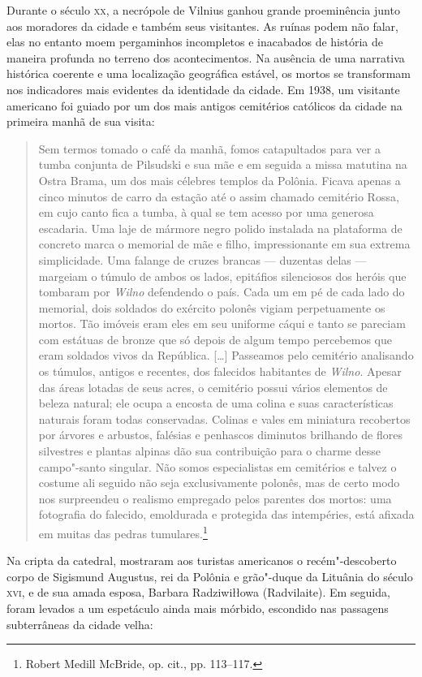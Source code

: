 Durante o século \textsc{xx}, a necrópole de Vilnius ganhou grande proeminência
junto aos moradores da cidade e também seus visitantes. As ruínas podem
não falar, elas no entanto moem pergaminhos incompletos e inacabados de
história de maneira profunda no terreno dos acontecimentos. Na ausência
de uma narrativa histórica coerente e uma localização geográfica
estável, os mortos se transformam nos indicadores mais evidentes da
identidade da cidade. Em 1938, um visitante americano foi guiado por um
dos mais antigos cemitérios católicos da cidade na primeira manhã de sua
visita:

\begin{quote}
Sem termos tomado o café da manhã, fomos catapultados para ver a tumba
conjunta de Pilsudski e sua mãe e em seguida a missa matutina na Ostra
Brama, um dos mais célebres templos da Polônia. Ficava apenas a cinco
minutos de carro da estação até o assim chamado cemitério Rossa, em cujo
canto fica a tumba, à qual se tem acesso por uma generosa escadaria. Uma
laje de mármore negro polido instalada na plataforma de concreto marca o
memorial de mãe e filho, impressionante em sua extrema simplicidade. Uma
falange de cruzes brancas --- duzentas delas --- margeiam o túmulo de ambos
os lados, epitáfios silenciosos dos heróis que tombaram por \textit{Wilno}
defendendo o país. Cada um em pé de cada lado do memorial, dois soldados
do exército polonês vigiam perpetuamente os mortos. Tão imóveis eram
eles em seu uniforme cáqui e tanto se pareciam com estátuas de bronze
que só depois de algum tempo percebemos que eram soldados vivos da
República. [\ldots{}] Passeamos pelo cemitério analisando os túmulos,
antigos e recentes, dos falecidos habitantes de \textit{Wilno}. Apesar das áreas
lotadas de seus acres, o cemitério possui vários elementos de beleza
natural; ele ocupa a encosta de uma colina e suas características
naturais foram todas conservadas. Colinas e vales em miniatura
recobertos por árvores e arbustos, falésias e penhascos diminutos
brilhando de flores silvestres e plantas alpinas dão sua contribuição
para o charme desse campo"-santo singular. Não somos especialistas em
cemitérios e talvez o costume ali seguido não seja exclusivamente
polonês, mas de certo modo nos surpreendeu o realismo empregado pelos
parentes dos mortos: uma fotografia do falecido, emoldurada e protegida
das intempéries, está afixada em muitas das pedras tumulares.\footnote{Robert Medill McBride, op. cit., pp. 113--117.} 
\end{quote}

Na cripta da catedral, mostraram aos turistas americanos o
recém"-descoberto corpo de Sigismund Augustus, rei da Polônia e
grão"-duque da Lituânia do século \textsc{xvi}, e de sua amada esposa, Barbara
Radziwiłłowa (Radvilaite). Em seguida, foram levados a um espetáculo
ainda mais mórbido, escondido nas passagens subterrâneas da cidade
velha:

